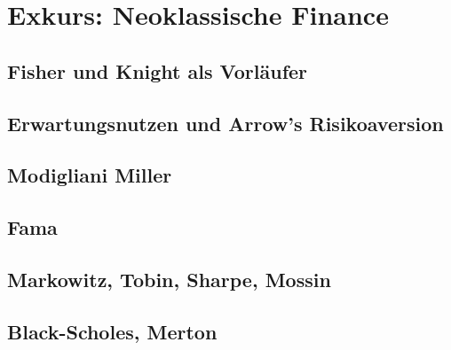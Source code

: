 %
%
%

\chapter{Exkurs: Neoklassische Finance}
\label{Finance}

\section{Fisher und Knight als Vorläufer}

\section{Erwartungsnutzen und Arrow's Risikoaversion}

\section{Modigliani Miller}

\section{Fama}

\section{Markowitz, Tobin, Sharpe, Mossin}

\section{Black-Scholes, Merton}


